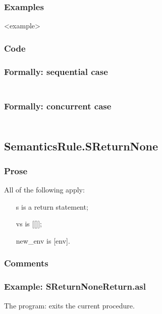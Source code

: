 \documentclass{book}
\begin{document}
    \subsubsection{Examples}
    <example>

  \subsubsection{Code}

  \subsubsection{Formally: sequential case}
  \begin{align}
  \end{align} 

  \subsubsection{Formally: concurrent case}
  \begin{align}
  \end{align} 

\subsection{SemanticsRule.SReturnNone \label{sec:SemanticsRule.SReturnNone}}

    \subsubsection{Prose}
    All of the following apply:
    \begin{itemize}
    \item [s] is a return statement;
    \item [vs] is [[]];
    \item [new\_env] is [env].
    \end{itemize}

    \subsubsection{Comments}

    \subsubsection{Example: SReturnNoneReturn.asl}
    The program:
    exits the current procedure.
\end{document}
